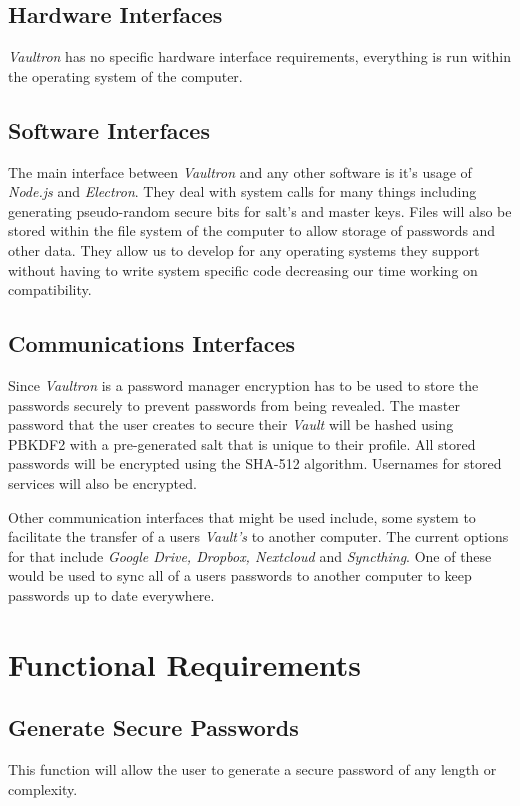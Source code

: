 \documentclass[11pt]{report}
\begin{document}
\subsection{Hardware Interfaces}
\textit{Vaultron} has no specific hardware interface requirements, everything is
run within the operating system of the computer. 


\subsection{Software Interfaces}
The main interface between \textit{Vaultron} and any other software is it's
usage of \textit{Node.js} and \textit{Electron}. They deal with system calls 
for many things including generating pseudo-random secure bits for salt's and 
master keys. Files will also be stored within the file system of the computer 
to allow storage of passwords and other data. They allow us to develop for
any operating systems they support without having to write system specific
code decreasing our time working on compatibility. 


\subsection{Communications Interfaces}
Since \textit{Vaultron} is a password manager encryption has to be used
to store the passwords securely to prevent passwords from being revealed.
The master password that the user creates to secure their \textit{Vault}
will be hashed using PBKDF2 with a pre-generated salt that is unique to
their profile. All stored passwords will be encrypted using the SHA-512 
algorithm. Usernames for stored services will also be encrypted.


Other communication interfaces that might be used include, some system
to facilitate the transfer of a users \textit{Vault's} to another computer.
The current options for that include \textit{Google Drive, Dropbox, Nextcloud}
and \textit{Syncthing}. One of these would be used to sync all of a users
passwords to another computer to keep passwords up to date everywhere.


\section{Functional Requirements}
\subsection{Generate Secure Passwords}
This function will allow the user to generate a secure password of any length or 
complexity.
\end{document}
